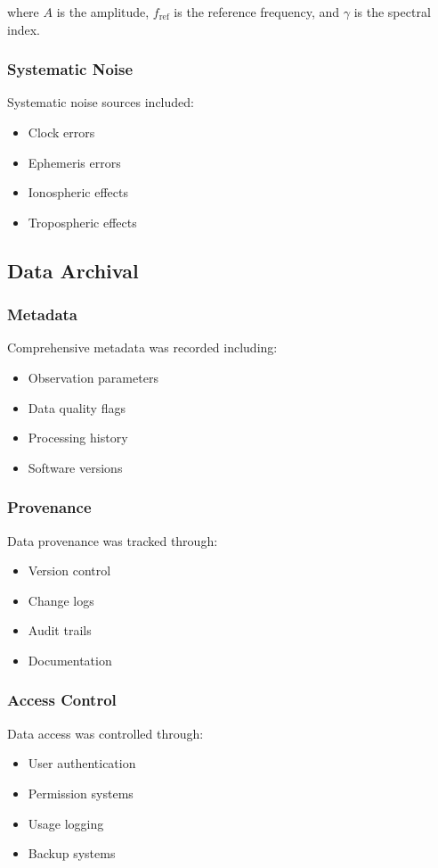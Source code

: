 where $A$ is the amplitude, $f_{\text{ref}}$ is the reference frequency, and $\gamma$ is the spectral index.

\subsubsection{Systematic Noise}
Systematic noise sources included:
\begin{itemize}
    \item Clock errors
    \item Ephemeris errors
    \item Ionospheric effects
    \item Tropospheric effects
\end{itemize}

\subsection{Data Archival}

\subsubsection{Metadata}
Comprehensive metadata was recorded including:
\begin{itemize}
    \item Observation parameters
    \item Data quality flags
    \item Processing history
    \item Software versions
\end{itemize}

\subsubsection{Provenance}
Data provenance was tracked through:
\begin{itemize}
    \item Version control
    \item Change logs
    \item Audit trails
    \item Documentation
\end{itemize}

\subsubsection{Access Control}
Data access was controlled through:
\begin{itemize}
    \item User authentication
    \item Permission systems
    \item Usage logging
    \item Backup systems
\end{itemize}

